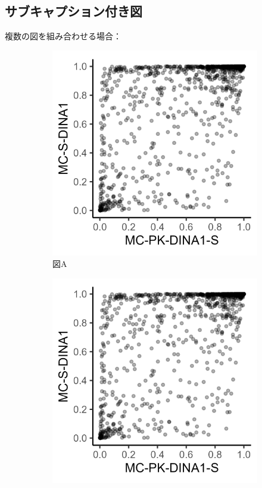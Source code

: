 \documentclass[../main/main.tex]{subfiles}
\begin{document}
\subsection{サブキャプション付き図}

複数の図を組み合わせる場合：

\begin{figure}[htbp]
    \centering
    \begin{subfigure}[b]{0.45\textwidth}
        \centering
        \includegraphics[width=\textwidth]{../images/Chap_A/demo_plot.png}
        \caption{図A}
        \label{fig:subplot_a}
    \end{subfigure}
    \hfill
    \begin{subfigure}[b]{0.45\textwidth}
        \centering
        \includegraphics[width=\textwidth]{../images/Chap_A/demo_plot.png}

\end{subfigure}
\end{figure}
\end{document}
